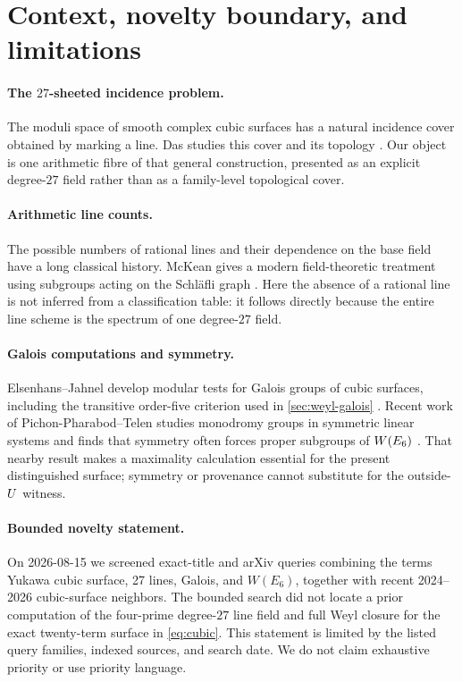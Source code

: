 \section{Context, novelty boundary, and limitations}
\label{sec:context-scope}

\paragraph{The \(27\)-sheeted incidence problem.}
The moduli space of smooth complex cubic surfaces has a natural incidence
cover obtained by marking a line.  Das studies this cover and its topology
\cite{Das2021}.  Our object is one arithmetic fibre of that general
construction, presented as an explicit degree-\(27\) field rather than as a
family-level topological cover.

\paragraph{Arithmetic line counts.}
The possible numbers of rational lines and their dependence on the base
field have a long classical history.  McKean gives a modern field-theoretic
treatment using subgroups acting on the Schläfli graph
\cite{McKean2021}.  Here the absence of a rational line is not inferred from
a classification table: it follows directly because the entire line scheme
is the spectrum of one degree-\(27\) field.

\paragraph{Galois computations and symmetry.}
Elsenhans--Jahnel develop modular tests for Galois groups of cubic surfaces,
including the transitive order-five criterion used in
\cref{sec:weyl-galois} \cite{ElsenhansJahnel2009}.  Recent work of
Pichon-Pharabod--Telen studies monodromy groups in symmetric linear systems
and finds that symmetry often forces proper subgroups of \(W(E_6)\)
\cite{PichonPharabodTelen2025}.  That nearby result makes a maximality
calculation essential for the present distinguished surface; symmetry or
provenance cannot substitute for the outside-\(U\) witness.

\paragraph{Bounded novelty statement.}
On 2026-08-15 we screened exact-title and arXiv queries combining the terms
Yukawa cubic surface, 27 lines, Galois, and \(W(E_6)\), together with recent
2024--2026 cubic-surface neighbors.  The bounded search did not locate a
prior computation of the four-prime degree-\(27\) line field and full Weyl
closure for the exact twenty-term surface in \cref{eq:cubic}.  This
statement is limited by the listed query families, indexed sources, and
search date.  We do not claim exhaustive priority or use priority language.

